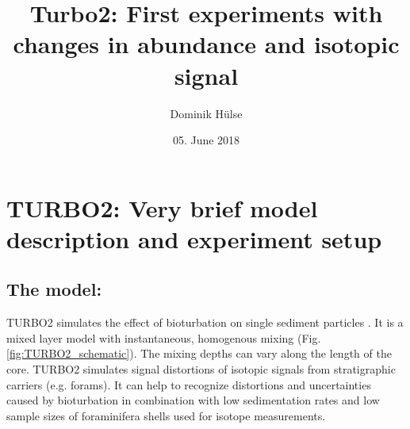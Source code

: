 \documentclass[a4paper,oneside,9pt]{article}
\begin{document}
\pagestyle{plain} %



\title{Turbo2: First experiments with changes in abundance and isotopic signal}
\author{Dominik H\"ulse} %
\date{05. June 2018} %
\maketitle


\section{TURBO2: Very brief model description and experiment setup}\label{Intro_TURBO2} %
\subsection{The model:}
TURBO2 simulates the effect of bioturbation on single sediment particles \citep{trauth_turbo2:_2013}. It is a mixed layer model with instantaneous, homogenous mixing (Fig. \ref{fig:TURBO2_schematic}).
The mixing depths can vary along the length of the core. TURBO2 simulates signal distortions of isotopic signals from stratigraphic carriers (e.g. forams). It can help to recognize distortions and uncertainties 
caused by bioturbation in combination with low sedimentation rates and low sample sizes of foraminifera shells used for isotope measurements.\\
\end{document}
